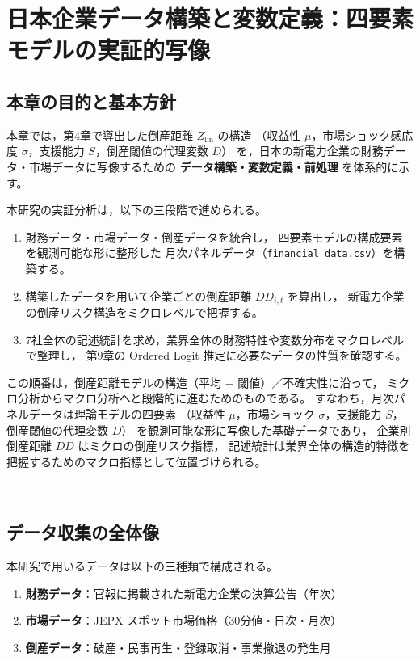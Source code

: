 \chapter{日本企業データ構築と変数定義：四要素モデルの実証的写像}
\label{chap:data_construction}

\section{本章の目的と基本方針}

本章では，第4章で導出した倒産距離 $Z_{\text{lin}}$ の構造
（収益性 $\mu$，市場ショック感応度 $\sigma$，支援能力 $S$，倒産閾値の代理変数 $D$）
を，日本の新電力企業の財務データ・市場データに写像するための
\textbf{データ構築・変数定義・前処理} を体系的に示す。

本研究の実証分析は，以下の三段階で進められる。

\begin{enumerate}
  \item 財務データ・市場データ・倒産データを統合し，
        四要素モデルの構成要素を観測可能な形に整形した
        月次パネルデータ（\texttt{financial\_data.csv}）を構築する。
  \item 構築したデータを用いて企業ごとの倒産距離 $DD_{i,t}$ を算出し，
        新電力企業の倒産リスク構造をミクロレベルで把握する。
  \item 7社全体の記述統計を求め，業界全体の財務特性や変数分布をマクロレベルで整理し，
        第9章の Ordered Logit 推定に必要なデータの性質を確認する。
\end{enumerate}

この順番は，倒産距離モデルの構造（平均 $-$ 閾値）／不確実性に沿って，
ミクロ分析からマクロ分析へと段階的に進むためのものである。
すなわち，月次パネルデータは理論モデルの四要素
（収益性 $\mu$，市場ショック $\sigma$，支援能力 $S$，倒産閾値の代理変数 $D$）
を観測可能な形に写像した基礎データであり，
企業別倒産距離 $DD$ はミクロの倒産リスク指標，
記述統計は業界全体の構造的特徴を把握するためのマクロ指標として位置づけられる。

---

\section{データ収集の全体像}

本研究で用いるデータは以下の三種類で構成される。

\begin{enumerate}
\item \textbf{財務データ}：官報に掲載された新電力企業の決算公告（年次）
\item \textbf{市場データ}：JEPX スポット市場価格（30分値・日次・月次）
\item \textbf{倒産データ}：破産・民事再生・登録取消・事業撤退の発生月
\end{enumerate}

